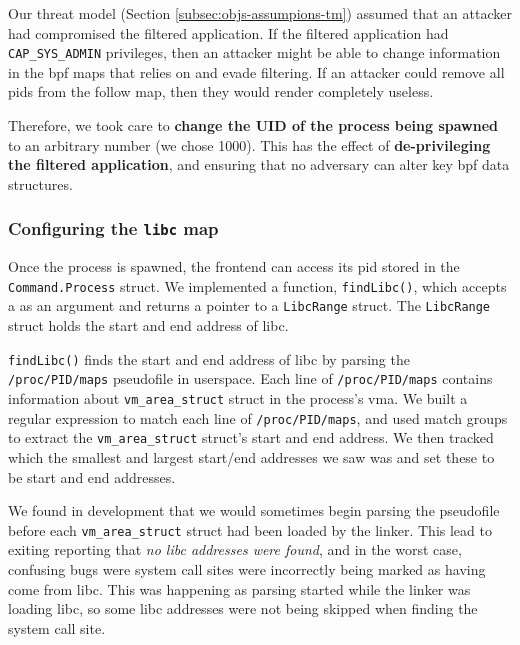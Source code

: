 Our threat model (Section \ref{subsec:objs-assumpions-tm}) assumed that an attacker
had compromised the filtered application. If the filtered application had
\texttt{CAP\_SYS\_ADMIN} privileges, then an attacker might be able to change
information in the \ac{bpf} maps that \af relies on and evade filtering. If an
attacker could remove all \acp{pid} from the follow map, then they would render
\af completely useless. 

Therefore, we took care to \textbf{change the UID of the process being spawned}
to an arbitrary number (we chose 1000). This has the effect of
\textbf{de-privileging the filtered application}, and ensuring that no adversary
can alter key \ac{bpf} data structures.


\subsubsection{Configuring the \texttt{libc} map}
Once the process is spawned, the frontend can access its \ac{pid} stored in the
\texttt{Command.Process} struct. We implemented a function, 
\texttt{findLibc()}, which accepts a  as an argument and returns a pointer to 
a \texttt{LibcRange}  struct. The \texttt{LibcRange} struct holds the start and end 
address of \ac{libc}.

\texttt{findLibc()} finds the start and end address of \ac{libc} by parsing the
\texttt{/proc/PID/maps} pseudofile in userspace. Each line of \texttt{/proc/PID/maps}
contains information about \texttt{vm\_area\_struct} struct in the process's \ac{vma}. We
built a regular expression to match each line of \texttt{/proc/PID/maps}, and
used match groups to extract the \texttt{vm\_area\_struct} struct's start and end address.
We then tracked which the smallest and largest start/end addresses we saw was
and set these to be  start and end addresses.

We found in development that we would sometimes begin parsing the pseudofile
before each \texttt{vm\_area\_struct} struct had been loaded by the linker. This lead to
\af exiting reporting that \textit{no \ac{libc} addresses were found}, and in
the worst case, confusing bugs were system call sites were incorrectly being marked as 
having come from \ac{libc}. This was happening as parsing started while the
linker was loading \ac{libc}, so some \ac{libc} addresses were not being skipped
when finding the system call site.

